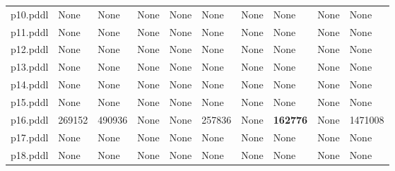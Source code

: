 \documentclass{article}
\begin{document}
\begin{tabular}{@{}lrrrrrrrrr@{}}
p10.pddl & \multicolumn{1}{|l|}{None} & \multicolumn{1}{|l|}{None} & \multicolumn{1}{|l|}{None} & \multicolumn{1}{|l|}{None} & \multicolumn{1}{|l|}{None} & \multicolumn{1}{|l|}{None} & \multicolumn{1}{|l|}{None} & \multicolumn{1}{|l|}{None} & \multicolumn{1}{|l|}{None} \\
p11.pddl & \multicolumn{1}{|l|}{None} & \multicolumn{1}{|l|}{None} & \multicolumn{1}{|l|}{None} & \multicolumn{1}{|l|}{None} & \multicolumn{1}{|l|}{None} & \multicolumn{1}{|l|}{None} & \multicolumn{1}{|l|}{None} & \multicolumn{1}{|l|}{None} & \multicolumn{1}{|l|}{None} \\
p12.pddl & \multicolumn{1}{|l|}{None} & \multicolumn{1}{|l|}{None} & \multicolumn{1}{|l|}{None} & \multicolumn{1}{|l|}{None} & \multicolumn{1}{|l|}{None} & \multicolumn{1}{|l|}{None} & \multicolumn{1}{|l|}{None} & \multicolumn{1}{|l|}{None} & \multicolumn{1}{|l|}{None} \\
p13.pddl & \multicolumn{1}{|l|}{None} & \multicolumn{1}{|l|}{None} & \multicolumn{1}{|l|}{None} & \multicolumn{1}{|l|}{None} & \multicolumn{1}{|l|}{None} & \multicolumn{1}{|l|}{None} & \multicolumn{1}{|l|}{None} & \multicolumn{1}{|l|}{None} & \multicolumn{1}{|l|}{None} \\
p14.pddl & \multicolumn{1}{|l|}{None} & \multicolumn{1}{|l|}{None} & \multicolumn{1}{|l|}{None} & \multicolumn{1}{|l|}{None} & \multicolumn{1}{|l|}{None} & \multicolumn{1}{|l|}{None} & \multicolumn{1}{|l|}{None} & \multicolumn{1}{|l|}{None} & \multicolumn{1}{|l|}{None} \\
p15.pddl & \multicolumn{1}{|l|}{None} & \multicolumn{1}{|l|}{None} & \multicolumn{1}{|l|}{None} & \multicolumn{1}{|l|}{None} & \multicolumn{1}{|l|}{None} & \multicolumn{1}{|l|}{None} & \multicolumn{1}{|l|}{None} & \multicolumn{1}{|l|}{None} & \multicolumn{1}{|l|}{None} \\
p16.pddl & 269152 & 490936 & \multicolumn{1}{|l|}{None} & \multicolumn{1}{|l|}{None} & 257836 & \multicolumn{1}{|l|}{None} & \textbf{162776} & \multicolumn{1}{|l|}{None} & 1471008 \\
p17.pddl & \multicolumn{1}{|l|}{None} & \multicolumn{1}{|l|}{None} & \multicolumn{1}{|l|}{None} & \multicolumn{1}{|l|}{None} & \multicolumn{1}{|l|}{None} & \multicolumn{1}{|l|}{None} & \multicolumn{1}{|l|}{None} & \multicolumn{1}{|l|}{None} & \multicolumn{1}{|l|}{None} \\
p18.pddl & \multicolumn{1}{|l|}{None} & \multicolumn{1}{|l|}{None} & \multicolumn{1}{|l|}{None} & \multicolumn{1}{|l|}{None} & \multicolumn{1}{|l|}{None} & \multicolumn{1}{|l|}{None} & \multicolumn{1}{|l|}{None} & \multicolumn{1}{|l|}{None} & \multicolumn{1}{|l|}{None} \\

\end{tabular}
\end{document}
